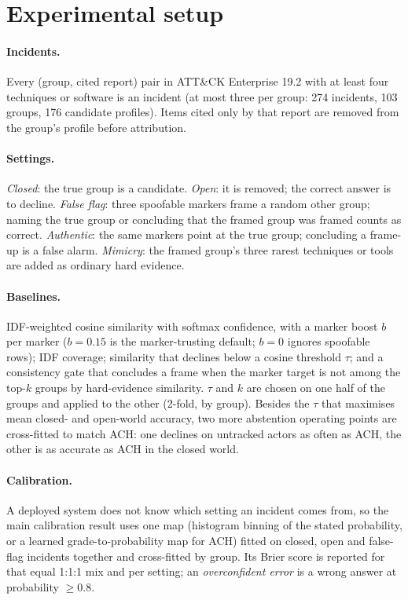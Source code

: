 \documentclass[11pt]{article}
\begin{document}
\section{Experimental setup}
\paragraph{Incidents.} Every (group, cited report) pair in ATT\&CK Enterprise
19.2 with at least four techniques or software is an incident (at most three
per group: 274 incidents, 103 groups, 176 candidate profiles). Items cited
only by that report are removed from the group's profile before attribution.
\paragraph{Settings.} \emph{Closed}: the true group is a candidate.
\emph{Open}: it is removed; the correct answer is to decline. \emph{False
flag}: three spoofable markers frame a random other group; naming the true
group or concluding that the framed group was framed counts as correct.
\emph{Authentic}: the same markers point at the true group; concluding a
frame-up is a false alarm. \emph{Mimicry}: the framed group's three rarest
techniques or tools are added as ordinary hard evidence.
\paragraph{Baselines.} IDF-weighted cosine similarity with softmax confidence,
with a marker boost $b$ per marker ($b=0.15$ is the marker-trusting default;
$b=0$ ignores spoofable rows); IDF coverage; similarity that declines below a
cosine threshold $\tau$; and a consistency gate that concludes a frame when
the marker target is not among the top-$k$ groups by hard-evidence similarity.
$\tau$ and $k$ are chosen on one half of the groups and applied to the other
(2-fold, by group). Besides the $\tau$ that maximises mean closed- and
open-world accuracy, two more abstention operating points are cross-fitted to
match ACH: one declines on untracked actors as often as ACH, the other is as
accurate as ACH in the closed world.
\paragraph{Calibration.} A deployed system does not know which setting an
incident comes from, so the main calibration result uses one map (histogram
binning of the stated probability, or a learned grade-to-probability map for
ACH) fitted on closed, open and false-flag incidents together and
cross-fitted by group. Its Brier score is reported for that equal 1:1:1 mix and
per setting; an \emph{overconfident error} is a wrong answer at probability
$\ge 0.8$.
\end{document}
